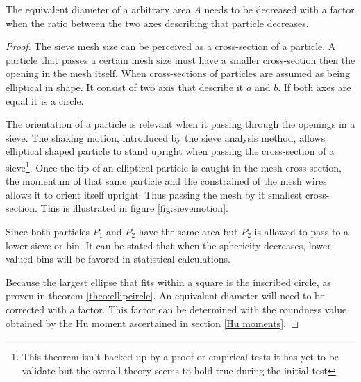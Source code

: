 \documentclass[11pt,fleqn,,a4paper,twoside,openright]{book}
\begin{document}
\begin{theorem}\label{theo:CorrBetweensphereandpart}
	The equivalent diameter of a arbitrary area $ A $ needs to be decreased with a factor when the ratio between the two axes describing that particle decreases.  
	
	\begin{proof}
			The sieve mesh size can be perceived as a cross-section of a particle. A particle that passes a certain mesh size must have a smaller cross-section then the opening in the mesh itself. When cross-sections of particles are assumed as being elliptical in shape. It consist of two axis that describe it $ a $ and $ b $. If both axes are equal it is a circle. 
			
			The orientation of a particle is relevant when it passing through the openings in a sieve. The shaking motion, introduced by the sieve analysis method, allows elliptical shaped particle to stand upright when passing the cross-section of a sieve\footnote{This theorem isn't backed up by a proof or empirical tests it has yet to be validate but the overall theory seems to hold true during the initial test}. Once the tip of an elliptical particle is caught in the mesh cross-section, the momentum of that same particle and the constrained of the mesh wires allows it to orient itself upright. Thus passing the mesh by it smallest cross-section. This is illustrated in figure \ref{fig:sievemotion}.
			
			Since both particles $ P_1 $ and $ P_2 $ have the same area but $ P_2 $ is allowed to pass to a lower sieve or bin. It can be stated that when the sphericity decreases, lower valued bins will be favored in statistical calculations.
			
			Because the largest ellipse that fits within a square is the inscribed circle, as proven in theorem \ref{theo:ellipcircle}. An equivalent diameter will need to be corrected with a factor. This factor can be determined with the roundness value obtained by the Hu moment ascertained in section \ref{Hu moments}. 
	\end{proof}

\end{theorem}
\end{document}
